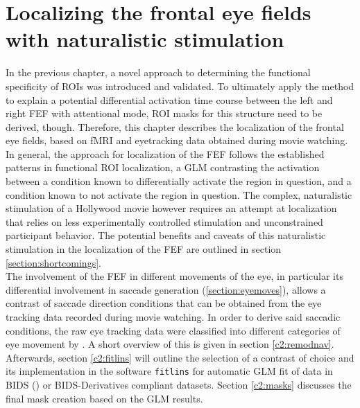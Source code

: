 \documentclass[a4paper, 12pt]{scrreprt}
\begin{document}
\chapter{Localizing the frontal eye fields with naturalistic stimulation}\label{c2}

In the previous chapter, a novel approach to determining the functional specificity of ROIs was introduced and validated. To ultimately apply the method to explain a potential differential activation time course between the left and right FEF with attentional mode, ROI masks for this structure need to be derived, though. Therefore, this chapter describes the localization of the frontal eye fields, based on fMRI and eyetracking data obtained during movie watching. \\
In general, the approach for localization of the FEF follows the established patterns in functional ROI localization, a GLM contrasting the activation between a condition known to differentially activate the region in question, and a condition known to not activate the region in question. The complex, naturalistic stimulation of a Hollywood movie however requires an attempt at localization that relies on less experimentally controlled stimulation and unconstrained participant behavior. The potential benefits and caveats of this naturalistic stimulation in the localization of the FEF are outlined in section \ref{section:shortcomings}. \\ 
The involvement of the FEF in different movements of the eye, in particular its differential involvement in saccade generation (\ref{section:eyemoves}), allows a contrast of saccade direction conditions that can be obtained from the eye tracking data recorded during movie watching. In order to derive said saccadic conditions, the raw eye tracking data were classified into different categories of eye movement by \textcite{dar2019}. A short overview of this is given in section \ref{c2:remodnav}. Afterwards, section \ref{c2:fitlins} will outline the selection of a contrast of choice and its implementation in the software \texttt{fitlins} for automatic GLM fit of data in BIDS (\cite{gorgolewski2016brain}) or BIDS-Derivatives compliant datasets. Section \ref{c2:masks} discusses the final mask creation based on the GLM results.
\end{document}
